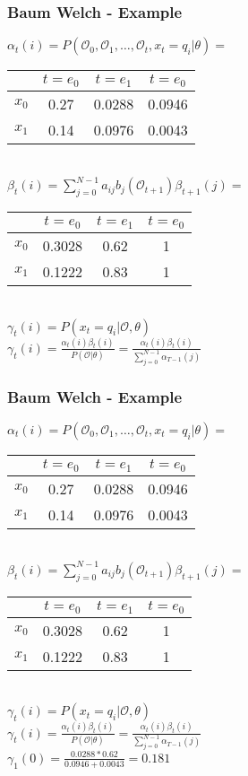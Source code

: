 \begin{frame}
	\frametitle{Baum Welch - Example}
  \begin{table}
  $\alpha_t(i) = P(\mathcal{O}_0, \mathcal{O}_1, \dots ,\mathcal{O}_t , x_t = q_i | \theta) =$
  \begin{tabular}{| c | c | c | c |}
  	\hline
          & $t=e_0$ & $t=e_1$ & $t=e_0$ \\ \hline
    $x_0$ & 0.27    & 0.0288  & 0.0946 \\ \hline
    $x_1$ & 0.14    & 0.0976  & 0.0043 \\ \hline
  \end{tabular}\\
  $\beta_t(i) = \sum\limits_{j=0}^{N-1} a_{ij} b_j(\mathcal{O}_{t+1})\beta_{t+1}(j) =$
  \begin{tabular}{| c | c | c | c |}
  	\hline
          & $t=e_0$ & $t=e_1$ & $t=e_0$ \\ \hline
    $x_0$ & 0.3028  & 0.62    & 1       \\ \hline
    $x_1$ & 0.1222  & 0.83    & 1       \\ \hline
  \end{tabular}\\
  $\gamma_t(i) = P(x_t = q_i|\mathcal{O},\theta)$\\
  $\gamma_t(i) = \frac{\alpha_t(i)\beta_t(i)}{P(\mathcal{O}|\theta)} = \frac{\alpha_t(i)\beta_t(i)}{\sum\limits_{j=0}^{N-1} \alpha_{T-1}(j)}$
\end{table}
\end{frame}

\begin{frame}
	\frametitle{Baum Welch - Example}
  \begin{table}
  $\alpha_t(i) = P(\mathcal{O}_0, \mathcal{O}_1, \dots ,\mathcal{O}_t , x_t = q_i | \theta) =$
  \begin{tabular}{| c | c | c | c |}
  	\hline
          & $t=e_0$ & $t=e_1$ & $t=e_0$ \\ \hline
    $x_0$ & 0.27    & 0.0288  & 0.0946 \\ \hline
    $x_1$ & 0.14    & 0.0976  & 0.0043 \\ \hline
  \end{tabular}\\
  $\beta_t(i) = \sum\limits_{j=0}^{N-1} a_{ij} b_j(\mathcal{O}_{t+1})\beta_{t+1}(j) =$
  \begin{tabular}{| c | c | c | c |}
  	\hline
          & $t=e_0$ & $t=e_1$ & $t=e_0$ \\ \hline
    $x_0$ & 0.3028  & 0.62    & 1       \\ \hline
    $x_1$ & 0.1222  & 0.83    & 1       \\ \hline
  \end{tabular}\\
  $\gamma_t(i) = P(x_t = q_i|\mathcal{O},\theta)$\\
  $\gamma_t(i) = \frac{\alpha_t(i)\beta_t(i)}{P(\mathcal{O}|\theta)} = \frac{\alpha_t(i)\beta_t(i)}{\sum\limits_{j=0}^{N-1} \alpha_{T-1}(j)}$\\
  $\gamma_1(0) = \frac{0.0288 * 0.62}{0.0946 + 0.0043} = 0.181$\\
\end{table}
\end{frame}

